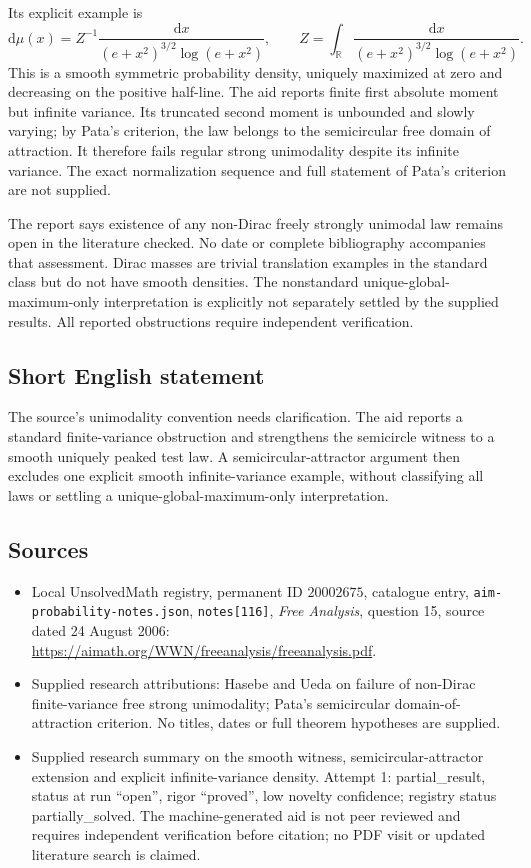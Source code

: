 \documentclass[11pt]{article}
\newcommand{\R}{\mathbb{R}}
\begin{document}
Its explicit example is
\[
 \mathrm d\mu(x)=Z^{-1}
 \frac{\mathrm dx}{(e+x^2)^{3/2}\log(e+x^2)},\qquad
 Z=\int_\R\frac{\mathrm dx}{(e+x^2)^{3/2}\log(e+x^2)}.
\]
This is a smooth symmetric probability density, uniquely maximized at zero and decreasing on the positive half-line. The aid reports finite first absolute moment but infinite variance. Its truncated second moment is unbounded and slowly varying; by Pata's criterion, the law belongs to the semicircular free domain of attraction. It therefore fails regular strong unimodality despite its infinite variance. The exact normalization sequence and full statement of Pata's criterion are not supplied.

The report says existence of any non-Dirac freely strongly unimodal law remains open in the literature checked. No date or complete bibliography accompanies that assessment. Dirac masses are trivial translation examples in the standard class but do not have smooth densities. The nonstandard unique-global-maximum-only interpretation is explicitly not separately settled by the supplied results. All reported obstructions require independent verification.
\subsection{Short English statement}
The source's unimodality convention needs clarification. The aid reports a standard finite-variance obstruction and strengthens the semicircle witness to a smooth uniquely peaked test law. A semicircular-attractor argument then excludes one explicit smooth infinite-variance example, without classifying all laws or settling a unique-global-maximum-only interpretation.
\subsection{Sources}
\begin{itemize}
\item Local UnsolvedMath registry, permanent ID \(20002675\), catalogue entry, \texttt{aim-probability-notes.json}, \texttt{notes[116]}, \emph{Free Analysis}, question 15, source dated 24 August 2006: \url{https://aimath.org/WWN/freeanalysis/freeanalysis.pdf}.
\item Supplied research attributions: Hasebe and Ueda on failure of non-Dirac finite-variance free strong unimodality; Pata's semicircular domain-of-attraction criterion. No titles, dates or full theorem hypotheses are supplied.
\item Supplied research summary on the smooth witness, semicircular-attractor extension and explicit infinite-variance density. Attempt 1: partial\_result, status at run ``open'', rigor ``proved'', low novelty confidence; registry status partially\_solved. The machine-generated aid is not peer reviewed and requires independent verification before citation; no PDF visit or updated literature search is claimed.
\end{itemize}
\end{document}
